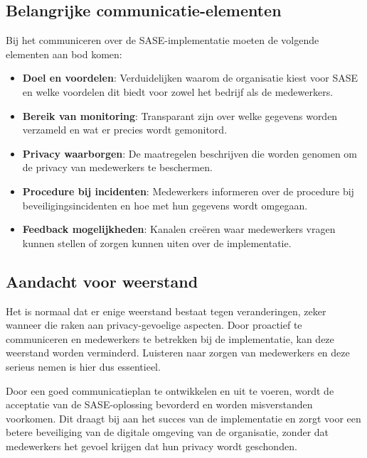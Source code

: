 \subsection{Belangrijke communicatie-elementen}
Bij het communiceren over de SASE-implementatie moeten de volgende elementen aan bod komen:

\begin{itemize}
    \item \textbf{Doel en voordelen}: Verduidelijken waarom de organisatie kiest voor SASE en welke voordelen dit biedt voor zowel het bedrijf als de medewerkers.
    \item \textbf{Bereik van monitoring}: Transparant zijn over welke gegevens worden verzameld en wat er precies wordt gemonitord.
    \item \textbf{Privacy waarborgen}: De maatregelen beschrijven die worden genomen om de privacy van medewerkers te beschermen.
    \item \textbf{Procedure bij incidenten}: Medewerkers informeren over de procedure bij beveiligingsincidenten en hoe met hun gegevens wordt omgegaan.
    \item \textbf{Feedback mogelijkheden}: Kanalen creëren waar medewerkers vragen kunnen stellen of zorgen kunnen uiten over de implementatie.
\end{itemize}

\subsection{Aandacht voor weerstand}
Het is normaal dat er enige weerstand bestaat tegen veranderingen, zeker wanneer die raken aan privacy-gevoelige aspecten. Door proactief te communiceren en medewerkers te betrekken bij de implementatie, kan deze weerstand worden verminderd. Luisteren naar zorgen van medewerkers en deze serieus nemen is hier dus essentieel.

\vspace{2ex}

Door een goed communicatieplan te ontwikkelen en uit te voeren, wordt de acceptatie van de SASE-oplossing bevorderd en worden misverstanden voorkomen. Dit draagt bij aan het succes van de implementatie en zorgt voor een betere beveiliging van de digitale omgeving van de organisatie, zonder dat medewerkers het gevoel krijgen dat hun privacy wordt geschonden.
